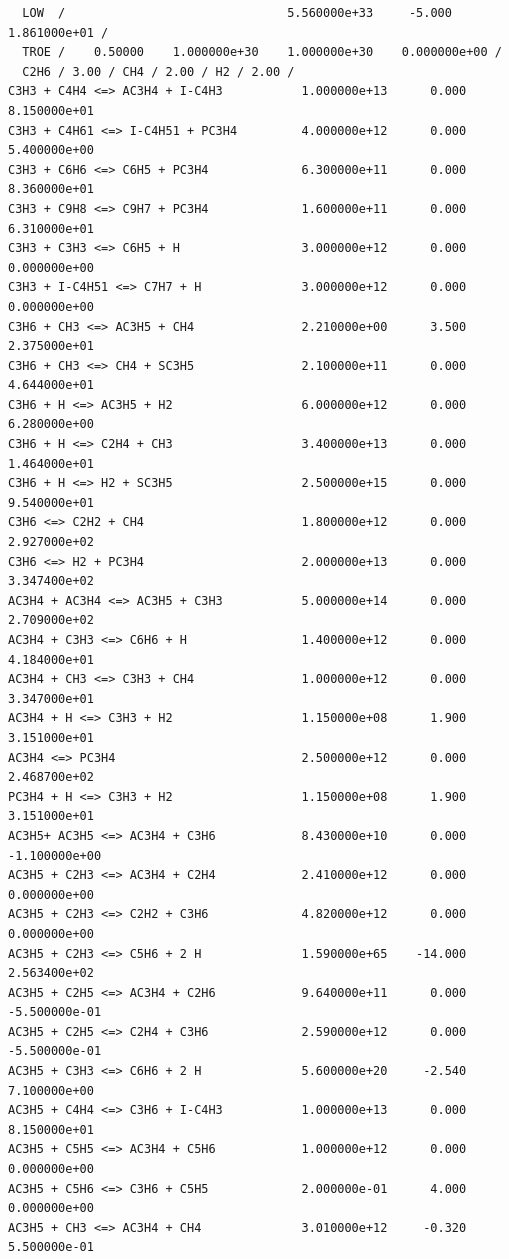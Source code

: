 \begin{verbatim}
  LOW  /                               5.560000e+33     -5.000    1.861000e+01 /
  TROE /    0.50000    1.000000e+30    1.000000e+30    0.000000e+00 /
  C2H6 / 3.00 / CH4 / 2.00 / H2 / 2.00 / 
C3H3 + C4H4 <=> AC3H4 + I-C4H3           1.000000e+13      0.000    8.150000e+01
C3H3 + C4H61 <=> I-C4H51 + PC3H4         4.000000e+12      0.000    5.400000e+00
C3H3 + C6H6 <=> C6H5 + PC3H4             6.300000e+11      0.000    8.360000e+01
C3H3 + C9H8 <=> C9H7 + PC3H4             1.600000e+11      0.000    6.310000e+01
C3H3 + C3H3 <=> C6H5 + H                 3.000000e+12      0.000    0.000000e+00
C3H3 + I-C4H51 <=> C7H7 + H              3.000000e+12      0.000    0.000000e+00
C3H6 + CH3 <=> AC3H5 + CH4               2.210000e+00      3.500    2.375000e+01
C3H6 + CH3 <=> CH4 + SC3H5               2.100000e+11      0.000    4.644000e+01
C3H6 + H <=> AC3H5 + H2                  6.000000e+12      0.000    6.280000e+00
C3H6 + H <=> C2H4 + CH3                  3.400000e+13      0.000    1.464000e+01
C3H6 + H <=> H2 + SC3H5                  2.500000e+15      0.000    9.540000e+01
C3H6 <=> C2H2 + CH4                      1.800000e+12      0.000    2.927000e+02
C3H6 <=> H2 + PC3H4                      2.000000e+13      0.000    3.347400e+02
AC3H4 + AC3H4 <=> AC3H5 + C3H3           5.000000e+14      0.000    2.709000e+02
AC3H4 + C3H3 <=> C6H6 + H                1.400000e+12      0.000    4.184000e+01
AC3H4 + CH3 <=> C3H3 + CH4               1.000000e+12      0.000    3.347000e+01
AC3H4 + H <=> C3H3 + H2                  1.150000e+08      1.900    3.151000e+01
AC3H4 <=> PC3H4                          2.500000e+12      0.000    2.468700e+02
PC3H4 + H <=> C3H3 + H2                  1.150000e+08      1.900    3.151000e+01
AC3H5+ AC3H5 <=> AC3H4 + C3H6            8.430000e+10      0.000   -1.100000e+00
AC3H5 + C2H3 <=> AC3H4 + C2H4            2.410000e+12      0.000    0.000000e+00
AC3H5 + C2H3 <=> C2H2 + C3H6             4.820000e+12      0.000    0.000000e+00
AC3H5 + C2H3 <=> C5H6 + 2 H              1.590000e+65    -14.000    2.563400e+02
AC3H5 + C2H5 <=> AC3H4 + C2H6            9.640000e+11      0.000   -5.500000e-01
AC3H5 + C2H5 <=> C2H4 + C3H6             2.590000e+12      0.000   -5.500000e-01
AC3H5 + C3H3 <=> C6H6 + 2 H              5.600000e+20     -2.540    7.100000e+00
AC3H5 + C4H4 <=> C3H6 + I-C4H3           1.000000e+13      0.000    8.150000e+01
AC3H5 + C5H5 <=> AC3H4 + C5H6            1.000000e+12      0.000    0.000000e+00
AC3H5 + C5H6 <=> C3H6 + C5H5             2.000000e-01      4.000    0.000000e+00
AC3H5 + CH3 <=> AC3H4 + CH4              3.010000e+12     -0.320    5.500000e-01

\end{verbatim}
